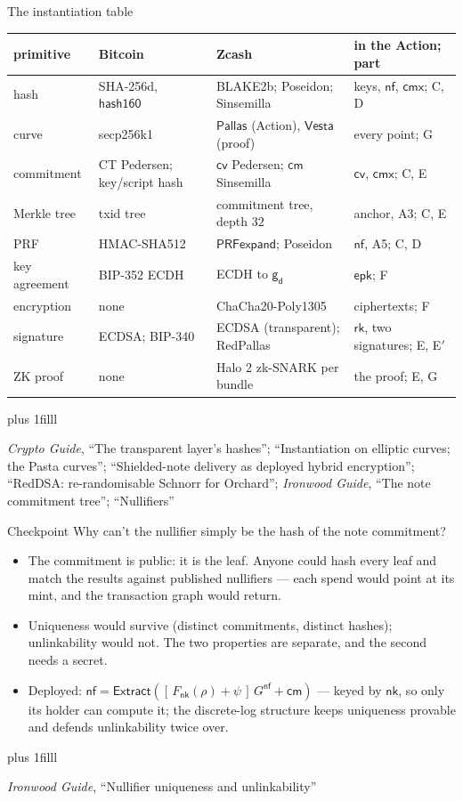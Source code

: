 \documentclass[aspectratio=169,11pt]{beamer}
\newcommand{\Pallas}{\ensuremath{\mathsf{Pallas}}}
\newcommand{\Vesta}{\ensuremath{\mathsf{Vesta}}}
\newcommand{\nfsym}{\ensuremath{\mathsf{nf}}}
\newcommand{\cmsym}{\ensuremath{\mathsf{cm}}}
\newcommand{\cmx}{\ensuremath{\mathsf{cmx}}}
\newcommand{\cvsym}{\ensuremath{\mathsf{cv}}}
\newcommand{\rksym}{\ensuremath{\mathsf{rk}}}
\newcommand{\gd}{\ensuremath{\mathsf{g_d}}}
\newcommand{\nksym}{\ensuremath{\mathsf{nk}}}
\newcommand{\epk}{\ensuremath{\mathsf{epk}}}
\newcommand{\Extract}{\ensuremath{\mathsf{Extract}}}
\newcommand{\src}[1]{\par\vskip0pt plus 1filll
  {\fontsize{6}{7.2}\selectfont\color{arbdim}\raggedright #1\par}}
\begin{document}
\begin{frame}{The instantiation table}
\begin{center}\small
\begin{tabular}{@{}lp{}p{}p{}@{}}
\toprule
primitive & Bitcoin & Zcash & in the Action; part \\
\midrule
hash & \raggedright SHA-256d, $\mathsf{hash160}$ & \raggedright BLAKE2b;
  Poseidon; Sinsemilla & \raggedright keys, $\nfsym$, $\cmx$; C, D
  \tabularnewline
curve & secp256k1 & \raggedright \Pallas{} (Action), \Vesta{} (proof) &
  \raggedright every point; G \tabularnewline
commitment & \raggedright CT Pedersen; key/script hash & \raggedright $\cvsym$
  Pedersen; $\cmsym$ Sinsemilla & \raggedright $\cvsym$, $\cmx$; C, E
  \tabularnewline
Merkle tree & txid tree & \raggedright commitment tree, depth $32$ &
  \raggedright anchor, A3; C, E \tabularnewline
PRF & HMAC-SHA512 & \raggedright $\mathsf{PRFexpand}$; Poseidon &
  \raggedright $\nfsym$, A5; C, D \tabularnewline
key agreement & BIP-352 ECDH & \raggedright ECDH to $\gd$ &
  \raggedright $\epk$; F \tabularnewline
encryption & none & ChaCha20-Poly1305 & \raggedright ciphertexts; F
  \tabularnewline
signature & \raggedright ECDSA; BIP-340 & \raggedright ECDSA (transparent);
  RedPallas & \raggedright $\rksym$, two signatures; E, E$'$
  \tabularnewline
ZK proof & none & \raggedright Halo 2 zk-SNARK per bundle &
  \raggedright the proof; E, G \tabularnewline
\bottomrule
\end{tabular}
\end{center}
\src{\emph{Crypto Guide}, ``The transparent layer's hashes''; ``Instantiation
  on elliptic curves; the Pasta curves''; ``Shielded-note delivery as
  deployed hybrid encryption''; ``RedDSA: re-randomisable Schnorr for
  Orchard''; \emph{Ironwood Guide}, ``The note commitment tree'';
  ``Nullifiers''}
\end{frame}

\begin{frame}{Checkpoint}
{\large Why can't the nullifier simply be the hash of the note commitment?}
\pause
\medskip
\begin{itemize}
  \item The commitment is public: it is the leaf. Anyone could hash every
    leaf and match the results against published nullifiers --- each spend
    would point at its mint, and the transaction graph would return.
  \item Uniqueness would survive (distinct commitments, distinct hashes);
    unlinkability would not. The two properties are separate, and the
    second needs a secret.
  \item Deployed: $\nfsym = \Extract([\,F_{\nksym}(\rho) + \psi\,]\,
    G^{\mathsf{nf}} + \cmsym)$ --- keyed by $\nksym$, so only its holder
    can compute it; the discrete-log structure keeps uniqueness provable
    and defends unlinkability twice over.
\end{itemize}
\src{\emph{Ironwood Guide}, ``Nullifier uniqueness and unlinkability''}
\end{frame}
\end{document}
